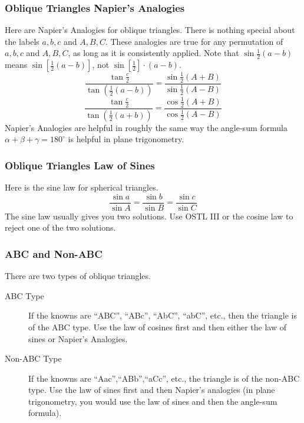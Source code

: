 \documentclass[xcolor=dvipsnames]{beamer}
\begin{document}
\begin{frame}
  \frametitle{Oblique Triangles Napier's Analogies}
Here are Napier's Analogies for oblique triangles. There is nothing
special about the labels $a,b,c$ and $A,B,C$. These analogies are true
for any permutation of $a,b,c$ and $A,B,C$, as long as it is
consistently applied. Note that $\sin\frac{1}{2}(a-b)$ means
$\sin[\frac{1}{2}(a-b)]$, not $\sin[\frac{1}{2}]\cdot{}(a-b)$.
\begin{equation}
  \label{eq:uteseivu}
    \frac{\tan\frac{c}{2}}{\tan\left(\frac{1}{2}(a-b)\right)}=\frac{\sin\frac{1}{2}(A+B)}{\sin\frac{1}{2}(A-B)}
\end{equation}
\begin{equation}
  \label{eq:yooneija}
    \frac{\tan\frac{c}{2}}{\tan\left(\frac{1}{2}(a+b)\right)}=\frac{\cos\frac{1}{2}(A+B)}{\cos\frac{1}{2}(A-B)}
\end{equation}
Napier's Analogies are helpful in roughly the same way the angle-sum
formula $\alpha+\beta+\gamma=180^{\circ}$ is helpful in plane
trigonometry.
\end{frame}

\begin{frame}
  \frametitle{Oblique Triangles Law of Sines}
  Here is the sine law for spherical triangles.
\begin{equation}
  \label{eq:aebaeyun}
  \frac{\sin{}a}{\sin{}A}=\frac{\sin{}b}{\sin{}B}=\frac{\sin{}c}{\sin{}C}
\end{equation}
The sine law usually gives you two solutions. Use OSTL III or the
cosine law to reject one of the two solutions.
\end{frame}

\begin{frame}
  \frametitle{ABC and Non-ABC}
  There are two types of oblique triangles.
  \begin{description}
  \item[ABC Type] If the knowns are ``ABC'', ``ABc'', ``AbC'', ``abC'', etc.,
    then the triangle is of the ABC type. Use the law of cosines first
    and then either the law of sines or Napier's Analogies.
  \item[Non-ABC Type] If the knowns are ``Aac'',``ABb'',``aCc'', etc., the
    triangle is of the non-ABC type. Use the law of sines first and
    then Napier's analogies (in plane trigonometry, you would use the
    law of sines and then the angle-sum formula).
  \end{description}
\end{frame}
\end{document}
